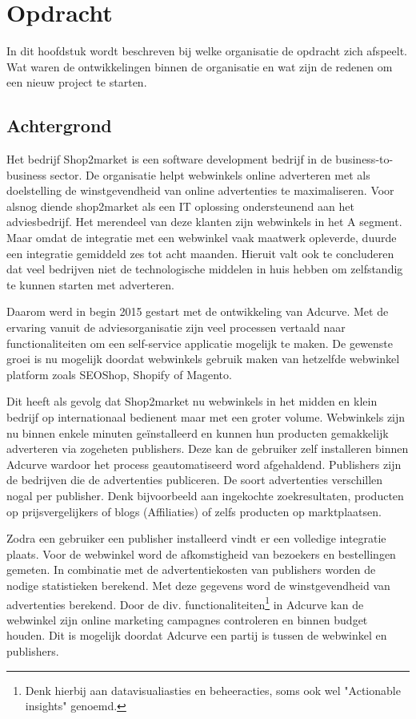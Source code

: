
\chapter{Opdracht}

In dit hoofdstuk wordt beschreven bij welke organisatie de opdracht zich afspeelt. Wat waren de ontwikkelingen binnen de organisatie en wat zijn de redenen om een nieuw project te starten.

\section{Achtergrond}


Het bedrijf Shop2market is een software development bedrijf in de business-to-business sector. De organisatie helpt webwinkels online adverteren met als doelstelling de winstgevendheid van online advertenties te maximaliseren.
Voor alsnog diende shop2market als een IT oplossing ondersteunend aan het adviesbedrijf. Het merendeel van deze klanten zijn webwinkels in het A segment. Maar omdat de integratie met een webwinkel vaak maatwerk opleverde, duurde een integratie gemiddeld zes tot acht maanden. Hieruit valt ook te concluderen dat veel bedrijven niet de technologische middelen in huis hebben om zelfstandig te kunnen starten met adverteren.

Daarom werd in begin 2015 gestart met de ontwikkeling van Adcurve. Met de ervaring vanuit de adviesorganisatie zijn veel processen vertaald naar functionaliteiten om een self-service applicatie mogelijk te maken. De gewenste groei is nu mogelijk doordat webwinkels gebruik maken van hetzelfde webwinkel platform zoals SEOShop, Shopify of Magento.

Dit heeft als gevolg dat Shop2market nu webwinkels in het midden en klein bedrijf op internationaal bedienent maar met een groter volume. Webwinkels zijn nu binnen enkele minuten geïnstalleerd en kunnen hun producten gemakkelijk adverteren via zogeheten publishers. Deze kan de gebruiker zelf installeren binnen Adcurve wardoor het process geautomatiseerd word afgehaldend. Publishers zijn de bedrijven die de advertenties publiceren. De soort advertenties verschillen nogal per publisher. Denk bijvoorbeeld aan ingekochte zoekresultaten, producten op prijsvergelijkers of blogs (Affiliaties) of zelfs producten op marktplaatsen.

Zodra een gebruiker een publisher installeerd vindt er een volledige integratie plaats. Voor de webwinkel word de afkomstigheid van bezoekers en bestellingen gemeten. In combinatie met de advertentiekosten van publishers worden de nodige statistieken berekend. Met deze gegevens word de winstgevendheid van advertenties berekend. Door de div. functionaliteiten\footnote{Denk hierbij aan datavisualiasties en beheeracties, soms ook wel "Actionable insights" genoemd.} in Adcurve kan de webwinkel zijn online marketing campagnes controleren en binnen budget houden. Dit is mogelijk doordat Adcurve een partij is tussen de webwinkel en publishers.
\pagebreak

